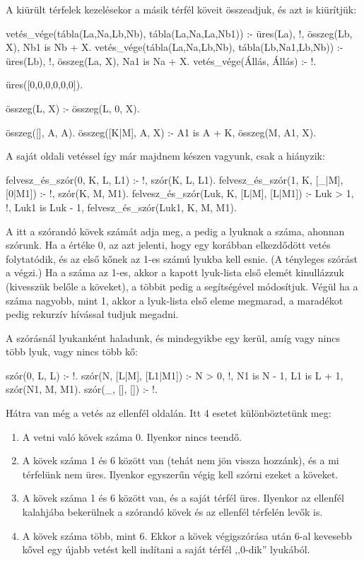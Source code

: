 A kiürült térfelek kezelésekor a másik térfél köveit
összeadjuk, és azt is kiürítjük:
\begin{program}
vetés_vége(tábla(La,Na,Lb,Nb),
           tábla(La,Na,La,Nb1)) :-
    üres(La), !, összeg(Lb, X), Nb1 is Nb + X.
vetés_vége(tábla(La,Na,Lb,Nb),
           tábla(Lb,Na1,Lb,Nb)) :-
    üres(Lb), !, összeg(La, X), Na1 is Na + X.
vetés_vége(Állás, Állás) :- !.

üres([0,0,0,0,0,0]).

összeg(L, X) :- összeg(L, 0, X).

összeg([], A, A).
összeg([K|M], A, X) :-
    A1 is A + K,
    összeg(M, A1, X).
\end{program}

A saját oldali vetéssel így már majdnem készen
vagyunk, csak a  hiányzik:
\begin{program}
felvesz_és_szór(0, K, L, L1) :- %
    !, szór(K, L, L1).
felvesz_és_szór(1, K, [_|M], [0|M1]) :-
    !, szór(K, M, M1).
felvesz_és_szór(Luk, K, [L|M], [L|M1]) :-
    Luk > 1, !, Luk1 is Luk - 1,
    felvesz_és_szór(Luk1, K, M, M1).
\end{program}

A  itt a szórandó kövek számát adja meg, a
 pedig a lyuknak a száma, ahonnan
szórunk. Ha a  értéke 0, az azt jelenti,
hogy egy korábban elkezdődött vetés folytatódik, és
az első kőnek az 1-es számú lyukba kell esnie. (A
tényleges szórást a  végzi.) Ha a 
száma az 1-es, akkor a kapott lyuk-lista első elemét
kinullázzuk (kivesszük belőle a köveket), a többit
pedig a  segítségével módosítjuk. Végül ha
a  száma nagyobb, mint 1, akkor a lyuk-lista
első eleme megmarad, a maradékot pedig rekurzív
hívással tudjuk megadni.

A szórásnál lyukanként haladunk, és mindegyikbe egy
kerül, amíg vagy nincs több lyuk, vagy nincs több
kő:
\begin{program}
szór(0, L, L) :- !.
szór(N, [L|M], [L1|M1]) :-
    N > 0, !,
    N1 is N - 1, L1 is L + 1,
    szór(N1, M, M1).
szór(_, [], []) :- !.
\end{program}

Hátra van még a vetés az ellenfél oldalán. Itt 4
esetet különböztetünk meg:
\begin{enumerate}
\item A vetni való kövek száma 0. Ilyenkor nincs
  teendő.
\item A kövek száma 1 és 6 között van (tehát nem jön
  vissza hozzánk), és a mi térfelünk nem
  üres. Ilyenkor egyszerűn végig kell szórni ezeket
  a köveket.
\item A kövek száma 1 és 6 között van, és a saját
  térfél üres. Ilyenkor az ellenfél kalahjába
  bekerülnek a szórandó kövek és az ellenfél
  térfelén levők is.
\item A kövek száma több, mint 6. Ekkor a kövek
  végigszórása után 6-al kevesebb kővel egy újabb
  vetést kell indítani a saját térfél ,,0-dik''
  lyukából.
\end{enumerate}

